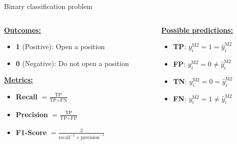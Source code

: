 \documentclass{beamer} %
\begin{document}
\begin{frame}{Binary classification problem}
\begin{columns}

\begin{column}{.5\textwidth}
	\textbf{\underline{Outcomes:}}\\
	\begin{itemize}
		\item \textbf{1} (Positive): Open a position
		\item \textbf{0} (Negative): Do not open a position
	\end{itemize}
	
	\textbf{\underline{Metrics:}}\\
	\begin{itemize}
		\item \textbf{Recall} $= \frac{\text{TP}}{\text{TP} + \text{FN}}$
		\item \textbf{Precision} $= \frac{\text{TP}}{\text{TP} + \text{FP}}$
		\item \textbf{F1-Score} $= \frac{2}{\text{recall}^{-1} + 
		\text{precision}^{-1}}$
	\end{itemize}
\end{column}
\begin{column}{.5\textwidth}
	\textbf{\underline{Possible predictions:}}\\
	\begin{itemize}
		\item \textbf{TP}: $y_i^{\text{M2}} = 1 = \widehat{y}_i^{\text{M2}}$
		\vspace{.2cm}
		
		\item \textbf{FP}: $y_i^{\text{M2}} = 0 \neq 
		\widehat{y}_i^{\text{M2}}$
		\vspace{.2cm}
		
		\item \textbf{TN}: $y_i^{\text{M2}} = 0 = \widehat{y}_i^{\text{M2}}$
		\vspace{.2cm}
		
		\item \textbf{FN}: $y_i^{\text{M2}} = 1 \neq 
		\widehat{y}_i^{\text{M2}}$
		\vspace{.2cm}
	\end{itemize}
\end{column}

\end{columns}
\end{frame}
\end{document}
